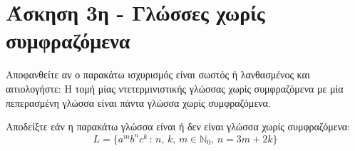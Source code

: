 \section{Άσκηση 3η - Γλώσσες χωρίς συμφραζόμενα}
\label{sec:Exercise_3}
\doublespacing

\bm{\textcolor{blue}{(α) [5\%]}} Αποφανθείτε αν ο παρακάτω ισχυρισμός είναι σωστός ή λανθασμένος και αιτιολογήστε:
Η τομή μίας ντετερμινιστικής γλώσσας χωρίς συμφραζόμενα με μία πεπερασμένη γλώσσα είναι πάντα γλώσσα χωρίς
συμφραζόμενα.

\bm{\textcolor{blue}{(β) [5\%]}} Αποδείξτε εάν η παρακάτω γλώσσα είναι ή δεν είναι γλώσσα χωρίς συμφραζόμενα:\\
\[L = \{a^mb^nc^k\,:\,n,\,k,\,m\in\mathbb{N}_0,\, n=3m+2k\}\]




\hfill \break


\clearpage